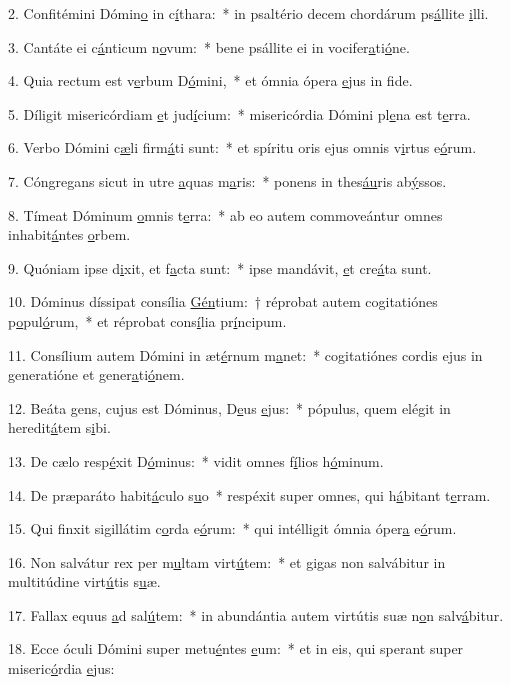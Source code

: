 2. Confitémini Dómin\uline{o} in c\uline{í}thara:~* in psaltério decem chordárum ps\uline{á}llite \uline{i}lli.\par 
3. Cantáte ei c\uline{á}nticum n\uline{o}vum:~* bene psállite ei in vocifer\uline{a}ti\uline{ó}ne.\par 
4. Quia rectum est v\uline{e}rbum D\uline{ó}mini,~* et ómnia ópera \uline{e}jus in f\uline{i}de.\par 
5. Díligit misericórdiam \uline{e}t jud\uline{í}cium:~* misericórdia Dómini pl\uline{e}na est t\uline{e}rra.\par 
6. Verbo Dómini c\uline{æ}li firm\uline{á}ti sunt:~* et spíritu oris ejus omnis v\uline{i}rtus e\uline{ó}rum.\par 
7. Cóngregans sicut in utre \uline{a}quas m\uline{a}ris:~* ponens in thes\uline{áu}ris ab\uline{ý}ssos.\par 
8. Tímeat Dóminum \uline{o}mnis t\uline{e}rra:~* ab eo autem commoveántur omnes inhabit\uline{á}ntes \uline{o}rbem.\par 
9. Quóniam ipse d\uline{i}xit, et f\uline{a}cta sunt:~* ipse mandávit, \uline{e}t cre\uline{á}ta sunt.\par 
10. Dóminus díssipat consília \uline{Gén}tium:~† réprobat autem cogitatiónes p\uline{o}pul\uline{ó}rum,~* et réprobat cons\uline{í}lia pr\uline{í}ncipum.\par 
11. Consílium autem Dómini in æt\uline{é}rnum m\uline{a}net:~* cogitatiónes cordis ejus in generatióne et gener\uline{a}ti\uline{ó}nem.\par 
12. Beáta gens, cujus est Dóminus, D\uline{e}us \uline{e}jus:~* pópulus, quem elégit in heredit\uline{á}tem s\uline{i}bi.\par 
13. De cælo resp\uline{é}xit D\uline{ó}minus:~* vidit omnes f\uline{í}lios h\uline{ó}minum.\par 
14. De præparáto habit\uline{á}culo s\uline{u}o~* respéxit super omnes, qui h\uline{á}bitant t\uline{e}rram.\par 
15. Qui finxit sigillátim c\uline{o}rda e\uline{ó}rum:~* qui intélligit ómnia óper\uline{a} e\uline{ó}rum.\par 
16. Non salvátur rex per m\uline{u}ltam virt\uline{ú}tem:~* et gigas non salvábitur in multitúdine virt\uline{ú}tis s\uline{u}æ.\par 
17. Fallax equus \uline{a}d sal\uline{ú}tem:~* in abundántia autem virtútis suæ n\uline{o}n salv\uline{á}bitur.\par 
18. Ecce óculi Dómini super metu\uline{é}ntes \uline{e}um:~* et in eis, qui sperant super miseric\uline{ó}rdia \uline{e}jus:\par 
